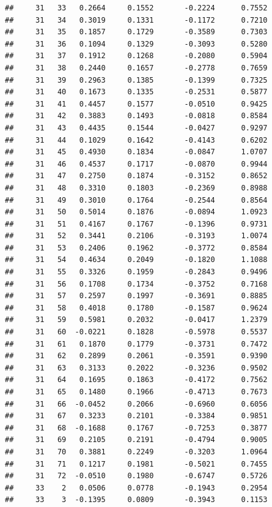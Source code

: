 \documentclass[
]{article}
\begin{document}
\begin{verbatim}
##     31   33   0.2664     0.1552       -0.2224      0.7552  
##     31   34   0.3019     0.1331       -0.1172      0.7210  
##     31   35   0.1857     0.1729       -0.3589      0.7303  
##     31   36   0.1094     0.1329       -0.3093      0.5280  
##     31   37   0.1912     0.1268       -0.2080      0.5904  
##     31   38   0.2440     0.1657       -0.2778      0.7659  
##     31   39   0.2963     0.1385       -0.1399      0.7325  
##     31   40   0.1673     0.1335       -0.2531      0.5877  
##     31   41   0.4457     0.1577       -0.0510      0.9425  
##     31   42   0.3883     0.1493       -0.0818      0.8584  
##     31   43   0.4435     0.1544       -0.0427      0.9297  
##     31   44   0.1029     0.1642       -0.4143      0.6202  
##     31   45   0.4930     0.1834       -0.0847      1.0707  
##     31   46   0.4537     0.1717       -0.0870      0.9944  
##     31   47   0.2750     0.1874       -0.3152      0.8652  
##     31   48   0.3310     0.1803       -0.2369      0.8988  
##     31   49   0.3010     0.1764       -0.2544      0.8564  
##     31   50   0.5014     0.1876       -0.0894      1.0923  
##     31   51   0.4167     0.1767       -0.1396      0.9731  
##     31   52   0.3441     0.2106       -0.3193      1.0074  
##     31   53   0.2406     0.1962       -0.3772      0.8584  
##     31   54   0.4634     0.2049       -0.1820      1.1088  
##     31   55   0.3326     0.1959       -0.2843      0.9496  
##     31   56   0.1708     0.1734       -0.3752      0.7168  
##     31   57   0.2597     0.1997       -0.3691      0.8885  
##     31   58   0.4018     0.1780       -0.1587      0.9624  
##     31   59   0.5981     0.2032       -0.0417      1.2379  
##     31   60  -0.0221     0.1828       -0.5978      0.5537  
##     31   61   0.1870     0.1779       -0.3731      0.7472  
##     31   62   0.2899     0.2061       -0.3591      0.9390  
##     31   63   0.3133     0.2022       -0.3236      0.9502  
##     31   64   0.1695     0.1863       -0.4172      0.7562  
##     31   65   0.1480     0.1966       -0.4713      0.7673  
##     31   66  -0.0452     0.2066       -0.6960      0.6056  
##     31   67   0.3233     0.2101       -0.3384      0.9851  
##     31   68  -0.1688     0.1767       -0.7253      0.3877  
##     31   69   0.2105     0.2191       -0.4794      0.9005  
##     31   70   0.3881     0.2249       -0.3203      1.0964  
##     31   71   0.1217     0.1981       -0.5021      0.7455  
##     31   72  -0.0510     0.1980       -0.6747      0.5726  
##     33    2   0.0506     0.0778       -0.1943      0.2954  
##     33    3  -0.1395     0.0809       -0.3943      0.1153  

\end{verbatim}
\end{document}
